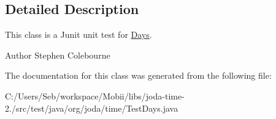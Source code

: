 \subsection{Detailed Description}
This class is a Junit unit test for \hyperlink{classorg_1_1joda_1_1time_1_1_days}{Days}.

\begin{DoxyAuthor}{Author}
Stephen Colebourne 
\end{DoxyAuthor}


The documentation for this class was generated from the following file\-:\begin{DoxyCompactItemize}
\item 
C\-:/\-Users/\-Seb/workspace/\-Mobii/libs/joda-\/time-\/2./src/test/java/org/joda/time/Test\-Days.\-java\end{DoxyCompactItemize}
